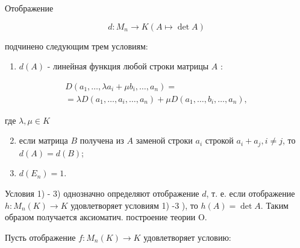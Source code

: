 \documentclass[10pt]{article}
\begin{document}
Отображение



\[

d: M_{n} \longrightarrow K(A \longmapsto \operatorname{det} A)

\]



подчинено следующим трем условиям:



\begin{enumerate}

  \item $d(A)$ - линейная функция любой строки матрицы $A$ :

\end{enumerate}



\[

\begin{gathered}

D\left(a_{1}, \ldots, \lambda a_{i}+\mu b_{i}, \ldots, a_{n}\right)= \\

=\lambda D\left(a_{1}, \ldots, a_{i}, \ldots, a_{n}\right)+\mu D\left(a_{1}, \ldots, b_{i}, \ldots, a_{n}\right),

\end{gathered}

\]



где $\lambda, \mu \in K$



\begin{enumerate}

  \setcounter{enumi}{1}

  \item если матрица $B$ получена из $A$ заменой строки $a_{i}$ строкой $a_{i}+a_{j}, i \neq j$, то $d(A)=d(B)$;



  \item $d\left(E_{n}\right)=1$.



\end{enumerate}



Условия 1) - 3) однозначно определяют отображение $d$, т. е. если отображение $h: M_{n}(K) \rightarrow K$ удовлетворяет условиям 1) -3 ), то $h(A)=\operatorname{det} A$. Таким образом получается аксиоматич. построение теории $\mathrm{O}$.



Пусть отображение $f: M_{n}(K) \rightarrow K$ удовлетворяет условию:
\end{document}
